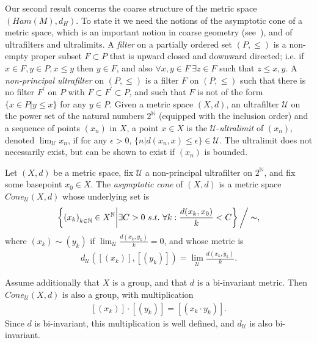 \documentclass[11pt]{article}
\newenvironment{myequation}
    {
        \begin{equation*}
        \begin{gathered}
    }
    { 
        \end{gathered} 
        \end{equation*}
    }
\newcommand{\N}{\mathbb{N}}
\begin{document}
        Our second result concerns the coarse structure of the metric space $(Ham(M), d_H)$. To state it we need the notions of the asymptotic cone of a metric space, which is an important notion in coarse geometry (see~\cite{G}), and of ultrafilters and ultralimits. A \textit{filter} on a partially ordered set $(P,\leq)$ is a non-empty proper subset $F \subset P$ that is upward closed and downward directed; i.e. if $x \in F, y \in P, x \leq y$ then $y \in F$, and also $\forall x,y \in F \ \exists z \in F$ such that $z \leq x,y$. A \textit{non-principal ultrafilter} on $(P,\leq)$ is a filter $F$ on $(P,\leq)$ such that there is no filter $F^\prime$ on $P$ with $F \subset F^\prime \subset P$, and such that $F$ is not of the form $\{x \in P | y \leq x\}$ for any $y \in P$. Given a metric space $(X,d)$, an ultrafilter $\mathcal{U}$ on the power set of the natural numbers $2^\N$ (equipped with the inclusion order) and a sequence of points $(x_n)$ in $X$, a point $x \in X$ is the $\mathcal{U}$-\textit{ultralimit} of $(x_n)$, denoted $\lim_\mathcal{U} x_n$, if for any $\epsilon > 0$, $\{n | d(x_n,x) \leq \epsilon\} \in \mathcal{U}$. The ultralimit does not necessarily exist, but can be shown to exist if $(x_n)$ is bounded.
        
        Let $(X,d)$ be a metric space, fix $\mathcal{U}$ a non-principal ultrafilter on $2^\N$, and fix some basepoint $x_0 \in X$. The \textit{asymptotic cone} of $(X,d)$ is a metric space $Cone_\mathcal{U}(X,d)$ whose underlying set is 
        \begin{myequation}
            \left\{ \left( x_k \right)_{k \in \N} \in X^\N \middle| \exists C > 0 \ s.t.\  \forall k: \frac{d(x_k,x_0)}{k} < C \right\} \bigg/ \thicksim ,
        \end{myequation}
        where $(x_k) \sim (y_k)$ if $\lim_\mathcal{U} \frac{d(x_k,y_k)}{k} = 0$, and whose metric is 
        \begin{myequation}
            d_\mathcal{U} ([(x_k)], [(y_k)]) = \lim_\mathcal{U} \frac{d(x_k,y_k)}{k} .
        \end{myequation}
        
        Assume additionally that $X$ is a group, and that $d$ is a bi-invariant metric. Then $Cone_\mathcal{U}(X,d)$ is also a group, with multiplication
        \begin{myequation}
            [(x_k)] \cdot [(y_k)] = [(x_k \cdot y_k)] .
        \end{myequation}
        Since $d$ is bi-invariant, this multiplication is well defined, and $d_\mathcal{U}$ is also bi-invariant.
        
\end{document}
